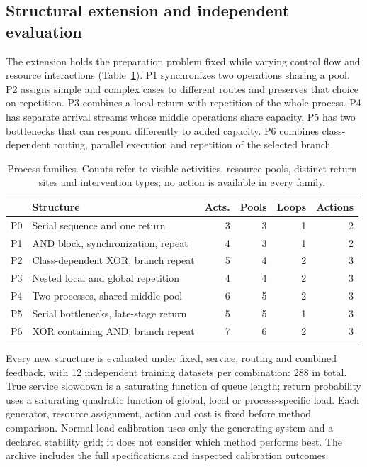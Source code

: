 \subsection{Structural extension and independent evaluation}
The extension holds the preparation problem fixed while varying control flow and resource interactions (Table~\ref{tab:processes}). P1 synchronizes two operations sharing a pool. P2 assigns simple and complex cases to different routes and preserves that choice on repetition. P3 combines a local return with repetition of the whole process. P4 has separate arrival streams whose middle operations share capacity. P5 has two bottlenecks that can respond differently to added capacity. P6 combines class-dependent routing, parallel execution and repetition of the selected branch.

\begin{table}[t]\caption{Process families. Counts refer to visible activities, resource pools, distinct return sites and intervention types; no action is available in every family.}\label{tab:processes}\centering\small\setlength{\tabcolsep}{4pt}
\begin{tabular}{lp{}rrrr}\toprule
 & Structure & Acts. & Pools & Loops & Actions\\\midrule
P0 & Serial sequence and one return & 3 & 3 & 1 & 2\\
P1 & AND block, synchronization, repeat & 4 & 3 & 1 & 2\\
P2 & Class-dependent XOR, branch repeat & 5 & 4 & 2 & 3\\
P3 & Nested local and global repetition & 4 & 4 & 2 & 3\\
P4 & Two processes, shared middle pool & 6 & 5 & 2 & 3\\
P5 & Serial bottlenecks, late-stage return & 5 & 5 & 1 & 3\\
P6 & XOR containing AND, branch repeat & 7 & 6 & 2 & 3\\
\bottomrule\end{tabular}\end{table}

Every new structure is evaluated under fixed, service, routing and combined feedback, with 12 independent training datasets per combination: 288 in total. True service slowdown is a saturating function of queue length; return probability uses a saturating quadratic function of global, local or process-specific load. Each generator, resource assignment, action and cost is fixed before method comparison. Normal-load calibration uses only the generating system and a declared stability grid; it does not consider which method performs best. The archive includes the full specifications and inspected calibration outcomes.

